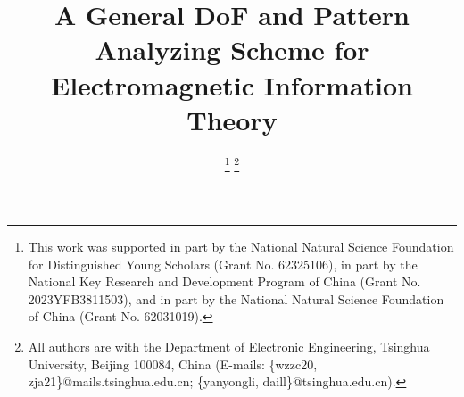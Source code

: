 \documentclass[12pt,draftclsnofoot,journal,onecolumn]{IEEEtran}
\begin{document}
	\title{A General DoF and Pattern Analyzing Scheme for Electromagnetic Information Theory}
	\author{
		\thanks{This work was supported in part by the National Natural Science Foundation for Distinguished Young Scholars (Grant No. 62325106), in part by the National Key Research and Development Program of China (Grant No. 2023YFB3811503), and in part by the National Natural Science Foundation of China (Grant No. 62031019).}
				\thanks{All authors are with the Department of Electronic Engineering, Tsinghua University, Beijing 100084, China (E-mails: \{wzzc20, zja21\}@mails.tsinghua.edu.cn; \{yanyongli, daill\}@tsinghua.edu.cn).} 
			
	}
	\maketitle
	
\end{document}
